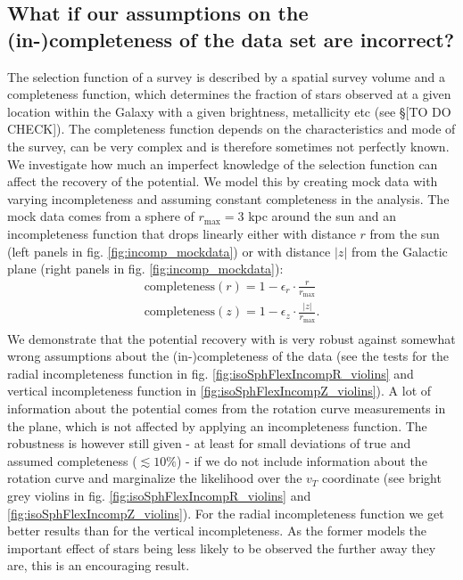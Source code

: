 \subsection{What if our assumptions on the (in-)completeness of the data set are incorrect?}

The selection function of a survey is described by a spatial survey volume and a completeness function, which determines the fraction of stars observed at a given location within the Galaxy with a given brightness, metallicity etc (see \S[TO DO CHECK]). The completeness function depends on the characteristics and mode of the survey, can be very complex and is therefore sometimes not perfectly known. We investigate how much an imperfect knowledge of the selection function can affect the recovery of the potential. We model this by creating mock data with varying incompleteness and assuming constant completeness in the analysis. The mock data comes from a sphere of $r_\text{max} = 3$ kpc around the sun and an incompleteness function that drops linearly either with distance $r$ from the sun (left panels in fig. \ref{fig:incomp_mockdata}) or with distance $|z|$ from the Galactic plane (right panels in fig. \ref{fig:incomp_mockdata}):
\begin{eqnarray}
\text{completeness}(r) = 1- \epsilon_r \cdot \frac{r}{r_\text{max}} \label{eq:radial_incomp}\\
\text{completeness}(z) = 1- \epsilon_z \cdot \frac{|z|}{r_\text{max}}. \label{eq:vertical_incomp}\\
\end{eqnarray}
We demonstrate that the potential recovery with  \RM is very robust against somewhat wrong assumptions about the (in-)completeness of the data (see the tests for the radial incompleteness function in fig. \ref{fig:isoSphFlexIncompR_violins} and vertical incompleteness function in \ref{fig:isoSphFlexIncompZ_violins}). A lot of information about the potential comes from the rotation curve measurements in the plane, which is not affected by applying an incompleteness function. The robustness is however still given - at least for small deviations of true and assumed completeness ($\lesssim 10\%$) - if we do not include information about the rotation curve and marginalize the likelihood over the $v_T$ coordinate (see bright grey violins in fig. \ref{fig:isoSphFlexIncompR_violins} and \ref{fig:isoSphFlexIncompZ_violins}). For the radial incompleteness function we get better results than for the vertical incompleteness. As the former models the important effect of stars being less likely to be observed the further away they are, this is an encouraging result.


